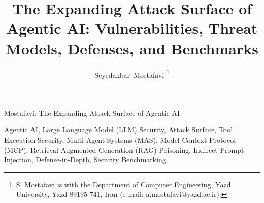 \documentclass[journal]{IEEEtran}
\begin{document}
\title{The Expanding Attack Surface of Agentic AI: Vulnerabilities, Threat Models, Defenses, and Benchmarks}

\author{
    Seyedakbar~Mostafavi%
    \thanks{S. Mostafavi is with the Department of Computer Engineering, Yazd University, Yazd 89195-741, Iran (e-mail: a.mostafavi@yazd.ac.ir).}
}

%
{Mostafavi: The Expanding Attack Surface of Agentic AI}

\maketitle



\begin{IEEEkeywords}
Agentic AI, Large Language Model (LLM) Security, Attack Surface, Tool Execution Security, Multi-Agent Systems (MAS), Model Context Protocol (MCP), Retrieval-Augmented Generation (RAG) Poisoning, Indirect Prompt Injection, Defense-in-Depth, Security Benchmarking.
\end{IEEEkeywords}

\IEEEpeerreviewmaketitle















\end{document}
